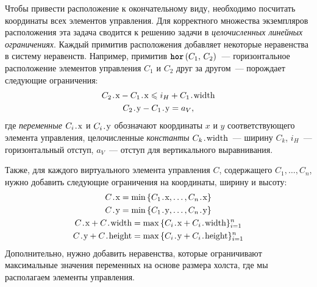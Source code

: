 Чтобы привести расположение к окончательному виду, необходимо посчитать координаты всех элементов управления.
Для корректного множества экземпляров расположения эта задача сводится к решению задачи в \emph{целочисленных линейных ограничениях}.
Каждый примитив расположения добавляет некоторые неравенства в систему неравенств. Например, примитив $\mbox{\texttt{\textbf{hor}}}\,(C_1,\,C_2)$~---
горизонтальное расположение элементов управления $C_1$ и $C_2$ друг за другом~--- порождает следующие ограничения:
\begin{gather*}
  C_2\prg{.x} - C_1\prg{.x} \leq i_H + C_1\prg{.width}\\
  C_2\prg{.y} - C_1\prg{.y} = a_V,
\end{gather*}
\noindent где \emph{переменные} $C_i\prg{.x}$ и $C_i\prg{.y}$ обозначают координаты $x$ и $y$ соответствующего элемента управления, целочисленные
\emph{константы} $C_k\prg{.width}$~--- ширину $C_k$, $i_H$~--- горизонтальный отступ, $a_V$~--- отступ для вертикального выравнивания.

Также, для каждого виртуального элемента управления $C$, содержащего $C_1, \ldots, C_n$, нужно добавить следующие ограничения на координаты, ширину и высоту:
  \begin{gather*}
    C\prg{.x} = \min\,\{C_1\prg{.x}, \ldots, C_n\prg{.x}\}\\
    C\prg{.y} = \min\,\{C_1\prg{.y}, \ldots, C_n\prg{.y}\}\\
    C\prg{.x} + C\prg{.width} = \max\,\{C_i\prg{.x} + C_i\prg{.width}\}_{i=1}^n\\
    C\prg{.y} + C\prg{.height} = \max\,\{C_i\prg{.y} + C_i\prg{.height}\}_{i=1}^n
  \end{gather*}
Дополнительно, нужно добавить неравенства, которые ограничивают максимальные значения переменных на основе размера холста, где мы располагаем элементы управления.

